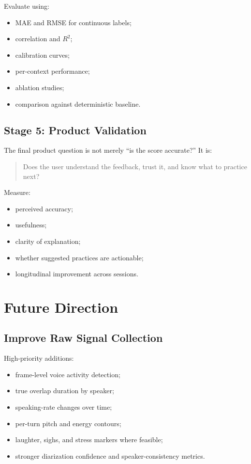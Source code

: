 \documentclass[11pt]{article}
\begin{document}
Evaluate using:

\begin{itemize}[leftmargin=*]
  \item MAE and RMSE for continuous labels;
  \item correlation and \(R^2\);
  \item calibration curves;
  \item per-context performance;
  \item ablation studies;
  \item comparison against deterministic baseline.
\end{itemize}

\subsection{Stage 5: Product Validation}

The final product question is not merely ``is the score accurate?'' It is:

\begin{quote}
Does the user understand the feedback, trust it, and know what to practice next?
\end{quote}

Measure:

\begin{itemize}[leftmargin=*]
  \item perceived accuracy;
  \item usefulness;
  \item clarity of explanation;
  \item whether suggested practices are actionable;
  \item longitudinal improvement across sessions.
\end{itemize}

\section{Future Direction}

\subsection{Improve Raw Signal Collection}

High-priority additions:

\begin{itemize}[leftmargin=*]
  \item frame-level voice activity detection;
  \item true overlap duration by speaker;
  \item speaking-rate changes over time;
  \item per-turn pitch and energy contours;
  \item laughter, sighs, and stress markers where feasible;
  \item stronger diarization confidence and speaker-consistency metrics.
\end{itemize}
\end{document}
